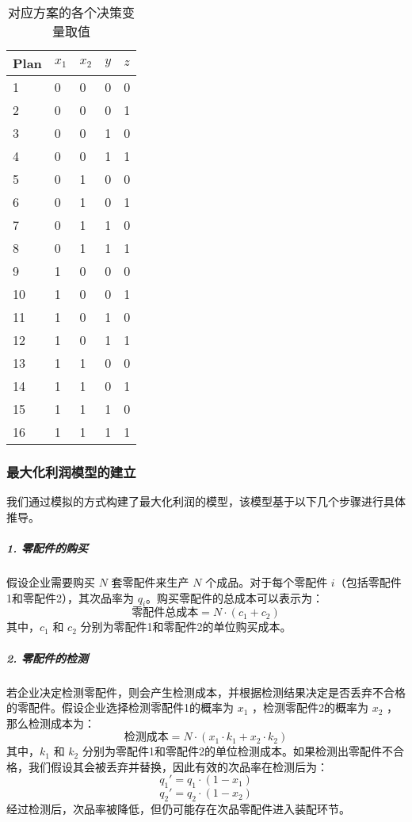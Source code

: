 \documentclass[utf8]{ctexart} %
\begin{document}
\begin{table}[htbp]
	\centering
	\caption{对应方案的各个决策变量取值}
	\label{tab:plans}
	\begin{tabularx}{\textwidth}{XXXXX}  %
		\toprule
		\textbf{Plan} & \textbf{$x_1$} & \textbf{$x_2$} & \textbf{$y$} & \textbf{$z$} \\
		\midrule
		1  & 0 & 0 & 0 & 0 \\
		2  & 0 & 0 & 0 & 1 \\
		3  & 0 & 0 & 1 & 0 \\
		4  & 0 & 0 & 1 & 1 \\
		5  & 0 & 1 & 0 & 0 \\
		6  & 0 & 1 & 0 & 1 \\
		7  & 0 & 1 & 1 & 0 \\
		8  & 0 & 1 & 1 & 1 \\
		9  & 1 & 0 & 0 & 0 \\
		10 & 1 & 0 & 0 & 1 \\
		11 & 1 & 0 & 1 & 0 \\
		12 & 1 & 0 & 1 & 1 \\
		13 & 1 & 1 & 0 & 0 \\
		14 & 1 & 1 & 0 & 1 \\
		15 & 1 & 1 & 1 & 0 \\
		16 & 1 & 1 & 1 & 1 \\
		\bottomrule
	\end{tabularx}
\end{table}
		
		\subsubsection{最大化利润模型的建立}
		
		
		我们通过模拟的方式构建了最大化利润的模型，该模型基于以下几个步骤进行具体推导。
		
		\subparagraph{1. 零配件的购买}
		
		假设企业需要购买 $N$ 套零配件来生产 $N$ 个成品。对于每个零配件 $i$（包括零配件1和零配件2），其次品率为 $q_i$。购买零配件的总成本可以表示为：
		\[
		\text{零配件总成本} = N \cdot (c_1 + c_2)
		\]
		其中，$c_1$ 和 $c_2$ 分别为零配件1和零配件2的单位购买成本。
		
		\subparagraph{2. 零配件的检测}
		
		若企业决定检测零配件，则会产生检测成本，并根据检测结果决定是否丢弃不合格的零配件。假设企业选择检测零配件1的概率为 $x_1$ ，检测零配件2的概率为 $x_2$ ，那么检测成本为：
		\[
		\text{检测成本} = N \cdot (x_1 \cdot k_1 + x_2 \cdot k_2)
		\]
		其中，$k_1$ 和 $k_2$ 分别为零配件1和零配件2的单位检测成本。如果检测出零配件不合格，我们假设其会被丢弃并替换，因此有效的次品率在检测后为：
		\[
		q_1' = q_1 \cdot (1 - x_1)
		\]
		\[
		q_2' = q_2 \cdot (1 - x_2)
		\]
		经过检测后，次品率被降低，但仍可能存在次品零配件进入装配环节。
		
\end{document}
